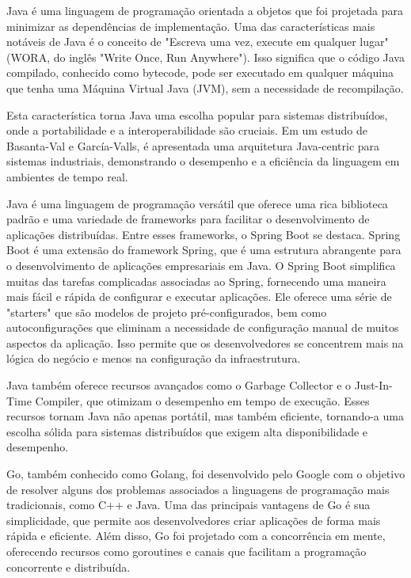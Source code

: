 Java é uma linguagem de programação orientada a objetos que foi projetada para minimizar as dependências de implementação. Uma das características mais notáveis de Java é o conceito de "Escreva uma vez, execute em qualquer lugar" (WORA, do inglês "Write Once, Run Anywhere"). Isso significa que o código Java compilado, conhecido como bytecode, pode ser executado em qualquer máquina que tenha uma Máquina Virtual Java (JVM), sem a necessidade de recompilação\cite{christopher2000high}.

Esta característica torna Java uma escolha popular para sistemas distribuídos, onde a portabilidade e a interoperabilidade são cruciais. Em um estudo de Basanta-Val e García-Valls, é apresentada uma arquitetura Java-centric para sistemas industriais, demonstrando o desempenho e a eficiência da linguagem em ambientes de tempo real\cite{basanta2014java}.

Java é uma linguagem de programação versátil que oferece uma rica biblioteca padrão e uma variedade de frameworks para facilitar o desenvolvimento de aplicações distribuídas. Entre esses frameworks, o Spring Boot se destaca. Spring Boot é uma extensão do framework Spring, que é uma estrutura abrangente para o desenvolvimento de aplicações empresariais em Java. O Spring Boot simplifica muitas das tarefas complicadas associadas ao Spring, fornecendo uma maneira mais fácil e rápida de configurar e executar aplicações. Ele oferece uma série de "starters" que são modelos de projeto pré-configurados, bem como autoconfigurações que eliminam a necessidade de configuração manual de muitos aspectos da aplicação. Isso permite que os desenvolvedores se concentrem mais na lógica do negócio e menos na configuração da infraestrutura\cite{dhalla2021performance}.

Java também oferece recursos avançados como o Garbage Collector e o Just-In-Time Compiler, que otimizam o desempenho em tempo de execução. Esses recursos tornam Java não apenas portátil, mas também eficiente, tornando-a uma escolha sólida para sistemas distribuídos que exigem alta disponibilidade e desempenho.

Go, também conhecido como Golang, foi desenvolvido pelo Google com o objetivo de resolver alguns dos problemas associados a linguagens de programação mais tradicionais, como C++ e Java. Uma das principais vantagens de Go é sua simplicidade, que permite aos desenvolvedores criar aplicações de forma mais rápida e eficiente. Além disso, Go foi projetado com a concorrência em mente, oferecendo recursos como goroutines e canais que facilitam a programação concorrente e distribuída\cite{grossman2016swat}.

